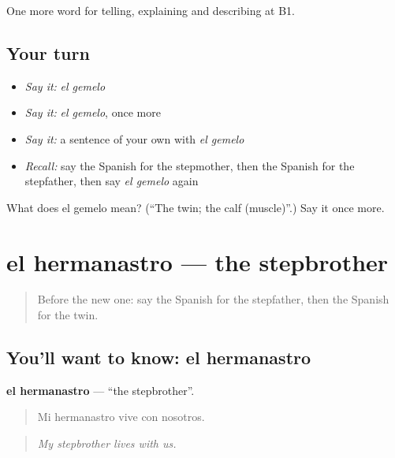 \begin{grammarlens}[title={What you've built}]
One more word for telling, explaining and describing at B1.
\end{grammarlens}

\subsection*{Your turn}
\begin{itemize}
\raggedright
  \item \emph{Say it:} \emph{el gemelo}
  \item \emph{Say it:} \emph{el gemelo}, once more
  \item \emph{Say it:} a sentence of your own with \emph{el gemelo}
  \item \emph{Recall:} say the Spanish for the stepmother, then the Spanish for the stepfather, then say \emph{el gemelo} again
\end{itemize}

\begin{tcolorbox}[breakable,colback=teal!4,colframe=teal!35!black,title={Before you move on}]
What does el gemelo mean? (\textquotedblleft{}The twin; the calf (muscle)\textquotedblright{}.) Say it once more.
\end{tcolorbox}
\section[el hermanastro]{el hermanastro — the stepbrother}

\label{lesson:ES-C749-hermanastro}



\begin{quote}
Before the new one: say the Spanish for the stepfather, then the Spanish for the twin.
\end{quote}

\subsection*{You'll want to know: el hermanastro}
\textbf{el hermanastro} — \textquotedblleft{}the stepbrother\textquotedblright{}.

\begin{quote}
Mi hermanastro vive con nosotros.
\end{quote}

\begin{quote}
\emph{My stepbrother lives with us.}
\end{quote}

